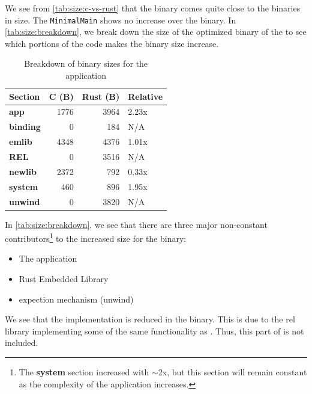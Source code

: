 We see from \autoref{tab:size:c-vs-rust} that the {\cg} binary comes quite close to the {\C} binaries in size.
The {\rust} \texttt{MinimalMain} shows no increase over the {\C} binary.
In \autoref{tab:size:breakdown}, we break down the size of the optimized binary of the {\tracker} to see which portions of the {\rust} code makes the binary size increase.

\begin{table}[H]
  \centering
  \begin{tabular}{l|r|r|l}
    \textbf{Section}      & \textbf{C (B)} & \textbf{Rust (B)} & \textbf{Relative} \\
    \hline
    \textbf{app}          & 1776 & 3964 & 2.23x \\
    \textbf{binding}      & 0    & 184  & N/A  \\
    \textbf{emlib}        & 4348 & 4376 & 1.01x \\
    \textbf{REL}          & 0    & 3516 & N/A  \\
    \textbf{newlib}       & 2372 & 792  & 0.33x \\
    \textbf{system}       & 460  & 896  & 1.95x \\
    \textbf{unwind}       & 0    & 3820 & N/A  \\
    \hline
  \end{tabular}
  \caption{Breakdown of binary sizes for the {\tracker} application}
  \label{tab:size:breakdown}
\end{table}

In \autoref{tab:size:breakdown}, we see that there are three major non-constant contributors\footnote{The \textbf{system} section increased with $\sim$2x, but this section will remain constant as the complexity of the application increases.} to the increased size for the {\rust} binary:

\begin{itemize}
\item The application
\item Rust Embedded Library
\item {\rust} expection mechanism (unwind)
\end{itemize}

We see that the  implementation is reduced in the {\rust} binary.
This is due to the \gls{rel} library implementing some of the same functionality as .
Thus, this part of  is not included.


